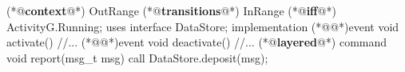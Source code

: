 \begin{Sbox}
\begin{minipage}{\columnwidth}
\begin{csource}
(*@\textbf{context}@*) OutRange {
 (*@\textbf{transitions}@*) InRange (*@\textbf{iff}@*) ActivityG.Running;
  uses interface DataStore;
}implementation {
 (*@@*)event void activate(){
  //...}
 (*@@*)event void deactivate(){
  //...}
 (*@\textbf{layered}@*) command void report(msg_t msg){
  call DataStore.deposit(msg);}}
\end{csource}
\end{minipage}
\end{Sbox}